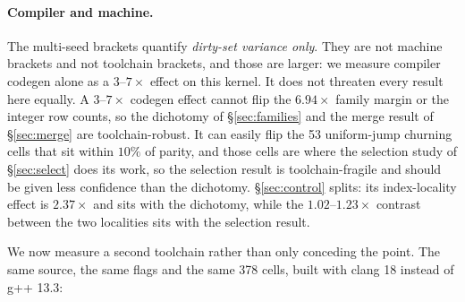 \documentclass{article}
\begin{document}
\paragraph{Compiler and machine.} The multi-seed brackets
quantify \emph{dirty-set variance only}. They are not machine brackets and not
toolchain brackets, and those are larger: we measure compiler codegen alone as a
$3$--$7\times$ effect on this kernel. It does not threaten every result here
equally. A $3$--$7\times$ codegen effect
cannot flip the $6.94\times$ family margin or the integer row counts, so the
dichotomy of \S\ref{sec:families} and the merge result of \S\ref{sec:merge} are
toolchain-robust. It can easily flip the 53 uniform-jump churning cells that sit
within $10\%$ of parity, and those cells are where the selection study of
\S\ref{sec:select} does its work, so the selection result is toolchain-fragile
and should be given less confidence than the dichotomy. \S\ref{sec:control}
splits: its index-locality effect is $2.37\times$ and sits with the dichotomy,
while the $1.02$--$1.23\times$ contrast between the two localities sits with the
selection result.

We now measure a second toolchain rather than only conceding the point. The
same source, the same flags and the same 378 cells, built with clang 18 instead
of g++ 13.3:
\end{document}

